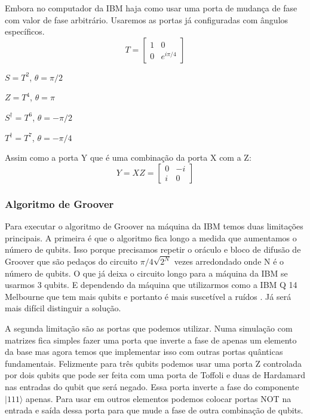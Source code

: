 \documentclass[12pt,a4paper]{article}
\begin{document}
Embora no computador da IBM haja como usar uma porta de mudança de fase com valor de fase arbitrário. Usaremos as portas já configuradas com ângulos específicos.
\begin{equation}
     T=\left [ \begin{array}{cc}
         1 & 0\\
    0 & e^{i\pi/4 } 
    \end{array}\right ]
\end{equation}

 $ S=T^2 $,     $ \theta = \pi/2 $

$ Z=T^4 $,     $  \theta = \pi$

$ S^\dagger=T^6 $, $  \theta = -\pi/2$

$ T^\dagger=T^7 $, $  \theta = -\pi/4$

Assim como a porta Y que é uma combinação da porta X com a Z:
\begin{equation}
 Y=XZ=\left[\begin{array}{cc}
    0 & -i\\
    i & 0 
    \end{array}\right]
\end{equation}

\subsubsection{Algoritmo de Groover}
Para executar o algoritmo de Groover na máquina da IBM temos duas limitações principais. A primeira é que o algoritmo fica longo a medida que aumentamos o número de qubits. Isso porque precisamos repetir o oráculo e bloco de difusão de Groover que são pedaços do circuito $\pi/4\sqrt{2^N}$ vezes arredondado onde N é o número de qubits. O que já deixa o circuito longo para a máquina da IBM se usarmos 3 qubits.  E dependendo da máquina que utilizarmos como a IBM Q 14 Melbourne que tem mais qubits e portanto é mais suscetível a ruídos . Já será mais difícil distinguir a solução. 

A segunda limitação são as portas que podemos utilizar. Numa simulação com matrizes fica simples fazer uma porta que inverte a fase de apenas um elemento da base mas agora temos que implementar isso com outras portas quânticas fundamentais. Felizmente para três qubits podemos usar uma porta Z controlada por dois qubits que pode ser feita com uma porta de Toffoli e duas de Hardamard nas entradas do qubit que será negado. Essa porta inverte a fase do componente $|111\rangle$ apenas. Para usar em outros elementos podemos colocar portas NOT na entrada e saída dessa porta para que mude a fase de outra combinação de qubits. 
\end{document}
